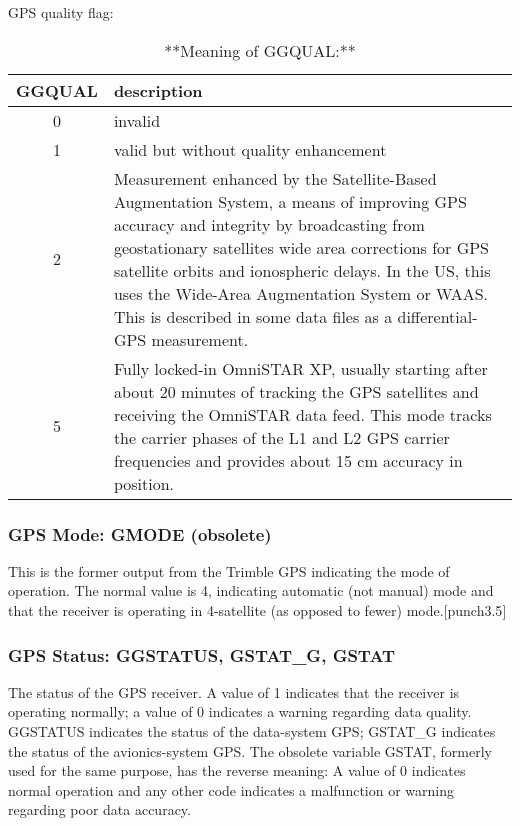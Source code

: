 \documentclass[
  english,
]{book}
\begin{document}
GPS quality flag:

\begin{table}

\caption{\label{tab:unnamed-chunk-68}**Meaning of GGQUAL:**}
\centering
\begin{tabular}[t]{c|l}
\hline
GGQUAL & description\\
\hline
0 & invalid\\
\hline
1 & valid but without quality enhancement\\
\hline
2 & Measurement enhanced by the Satellite-Based Augmentation System, a means of improving GPS accuracy and integrity by broadcasting from geostationary satellites wide area corrections for GPS satellite orbits and ionospheric delays. In the US, this uses the Wide-Area Augmentation System or WAAS. This is described in some data files as a differential-GPS measurement.\\
\hline
5 & Fully locked-in OmniSTAR XP, usually starting after about 20 minutes of tracking the GPS satellites and receiving the OmniSTAR data feed. This mode tracks the carrier phases of the L1 and L2 GPS carrier frequencies and provides about 15 cm accuracy in position.\\
\hline
\end{tabular}
\end{table}

\hypertarget{gmode}{%
\subsubsection*{GPS Mode: GMODE (obsolete)}\label{gmode}}

This is the former output from the Trimble GPS indicating the mode of operation. The normal value is 4, indicating automatic (not manual) mode and that the receiver is operating in 4-satellite (as opposed to fewer) mode.\protect\hypertarget{punch3.5}{}{{[}punch3.5{]}}

\hypertarget{ggstatus}{%
\subsubsection*{GPS Status: GGSTATUS, GSTAT\_G, GSTAT}\label{ggstatus}}

The status of the GPS receiver. A value of 1 indicates that the receiver is operating normally; a value of 0 indicates a warning regarding data quality. GGSTATUS indicates the status of the data-system GPS; GSTAT\_G indicates the status of the avionics-system GPS. The obsolete variable GSTAT, formerly used for the same purpose, has the reverse meaning: A value of 0 indicates normal operation and any other code indicates a malfunction or warning regarding poor data accuracy.
\end{document}
